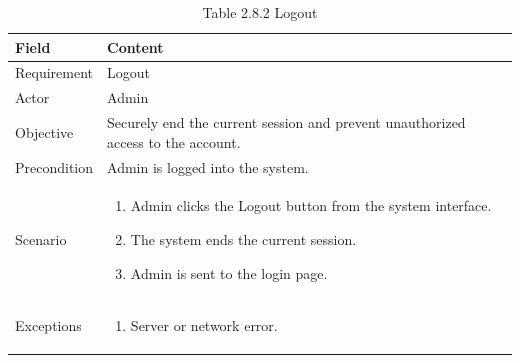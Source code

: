 \documentclass[12pt,oneside]{report}
\begin{document}
\begin{table}[H]
\centering
\caption{Table 2.8.2 Logout}
\label{tab:admin-logout}
\begin{tabularx}{\textwidth}{|p{3cm}|X|}
\hline
\textbf{Field} & \textbf{Content} \\ \hline

Requirement & Logout \\ \hline

Actor & Admin \\ \hline

Objective & Securely end the current session and prevent unauthorized access to the account. \\ \hline

Precondition & Admin is logged into the system. \\ \hline

Scenario & 
\begin{minipage}[t]{0.75\textwidth}
\begin{enumerate}[leftmargin=*,label=\arabic*.]
\item Admin clicks the Logout button from the system interface.
\item The system ends the current session.
\item Admin is sent to the login page.
\end{enumerate}
\end{minipage} \\ \hline

Exceptions &
\begin{minipage}[t]{0.75\textwidth}
\begin{enumerate}[leftmargin=*,label=\arabic*.]
\item Server or network error.
\end{enumerate}
\end{minipage} \\ \hline

\end{tabularx}
\end{table}
\end{document}
